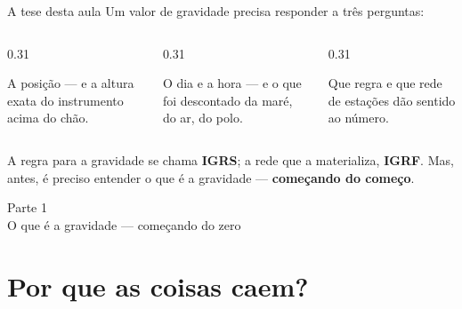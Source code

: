 \documentclass[aspectratio=169,11pt]{beamer}
\newcommand{\bnum}[1]{\textbf{\textcolor{mTeal}{#1}}}
\newcommand{\sist}[1]{\textcolor{corIdeal}{\textbf{#1}}}
\newcommand{\fram}[1]{\textcolor{corMedido}{\textbf{#1}}}
\begin{document}
\begin{frame}{A tese desta aula}
  Um valor de gravidade precisa responder a três perguntas:
  \bigskip
  \begin{columns}[T]
    \begin{column}{0.31\textwidth}
      \begin{regra}[title={Onde?}]
        \small\raggedright A posição --- e a altura exata do instrumento acima do chão.
      \end{regra}
    \end{column}
    \begin{column}{0.31\textwidth}
      \begin{regra}[title={Quando?}]
        \small\raggedright O dia e a hora --- e o que foi descontado da maré, do ar, do polo.
      \end{regra}
    \end{column}
    \begin{column}{0.31\textwidth}
      \begin{regra}[title={Em qual referencial?}]
        \small\raggedright Que regra e que rede de estações dão sentido ao número.
      \end{regra}
    \end{column}
  \end{columns}
  \bigskip
  \begin{ideia}[title={Aonde vamos chegar}]
    A regra para a gravidade se chama \sist{IGRS}; a rede que a materializa, \fram{IGRF}.
    Mas, antes, é preciso entender o que é a gravidade --- \bnum{começando do começo}.
  \end{ideia}
\end{frame}

\begin{frame}[standout]
  Parte 1\\[6pt]
  {\normalsize O que é a gravidade --- começando do zero}
\end{frame}

\section{Por que as coisas caem?}
\end{document}

